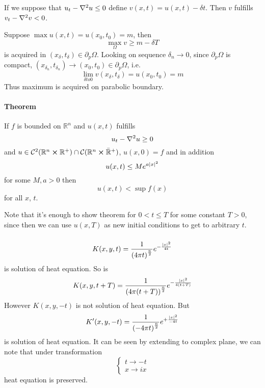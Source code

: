 If we suppose that  $u_t - \laplacian{u}\leq0$ define $v(x,t) = u(x,t) - \delta t$. Then $v$ fulfills $v_t - \laplacian{v} < 0$. 

Suppose $\max u(x,t) = u(x_0,t_0) = m$, then
$$\max \limits_{ \Omega} v \geq m -\delta T$$
is acquired in $(x_\delta, t_\delta) \in \partial_p \Omega$. Looking on sequence $\delta_n \to 0$, since $\partial_p \Omega$ is compact, $(x_{\delta_n}, t_{\delta_n}) \to (x_0, t_0) \in \partial_p \Omega$, i.e.
$$\lim_{\delta to 0} v(x_{\delta}, t_{\delta}) = u(x_0,t_0) = m$$
Thus maximum is acquired on parabolic boundary.
\paragraph{Theorem}
If $f$ is bounded on $\mathbb{R}^n$ and $u(x,t)$ fulfills
$$u_t - \laplacian{u} \geq 0$$
and $u \in \mathcal{C}^2(\mathbb{R}^n \cross \mathbb{R}^+) \cap \mathcal{C}(\mathbb{R}^n \cross \bar{\mathbb{R}}^+)$, $u(x,0) = f$ and in addition
$$u(x,t) \leq M e^{a\abs{x}^2}$$
for some $M,a>0$ then
$$u(x,t) < \sup f(x)$$ 
for all $x$, $t$. 

Note that it's enough to show theorem for $0<t\leq T$ for some constant $T>0$, since then we can use $u(x,T)$ as new initial conditions to get to arbitrary $t$.

\subparagraph{}
$$K(x,y,t) = \frac{1}{\qty(4\pi t)^{\frac{n}{2}}} e^{-\frac{\abs{x}^2}{4t}}$$
is solution of heat equation. So is 
$$K(x,y,t+T) = \frac{1}{\qty(4\pi (t+T))^{\frac{n}{2}}} e^{-\frac{\abs{x}^2}{4 (t+T)}}$$
However $K(x,y,-t)$ is not solution of heat equation. But
$$K'(x,y,-t) = \frac{1}{\qty(-4\pi t)^{\frac{n}{2}}} e^{+\frac{\abs{x}^2}{-4t}}$$
is solution of heat equation. It can be seen by extending to complex plane, we can note that under transformation
$$\begin{cases}
t \to -t\\
x \to ix
\end{cases}$$
heat equation is preserved.

